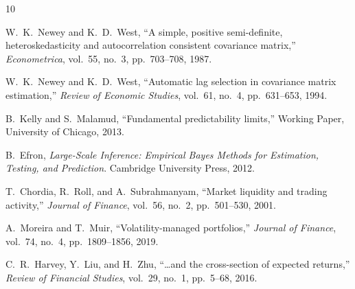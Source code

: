 \documentclass[11pt,a4paper]{article}
\theoremstyle{definition}
\begin{document}
\begin{thebibliography}{10}

W.~K.~Newey and K.~D.~West,
``A simple, positive semi-definite, heteroskedasticity and autocorrelation
consistent covariance matrix,''
\emph{Econometrica}, vol.~55, no.~3, pp.~703--708, 1987.

W.~K.~Newey and K.~D.~West,
``Automatic lag selection in covariance matrix estimation,''
\emph{Review of Economic Studies}, vol.~61, no.~4, pp.~631--653, 1994.

B.~Kelly and S.~Malamud,
``Fundamental predictability limits,''
Working Paper, University of Chicago, 2013.

B.~Efron,
\emph{Large-Scale Inference: Empirical Bayes Methods for Estimation,
Testing, and Prediction}.
Cambridge University Press, 2012.

T.~Chordia, R.~Roll, and A.~Subrahmanyam,
``Market liquidity and trading activity,''
\emph{Journal of Finance}, vol.~56, no.~2, pp.~501--530, 2001.

A.~Moreira and T.~Muir,
``Volatility-managed portfolios,''
\emph{Journal of Finance}, vol.~74, no.~4, pp.~1809--1856, 2019.

C.~R.~Harvey, Y.~Liu, and H.~Zhu,
``\dots and the cross-section of expected returns,''
\emph{Review of Financial Studies}, vol.~29, no.~1, pp.~5--68, 2016.

\end{thebibliography}
\end{document}
